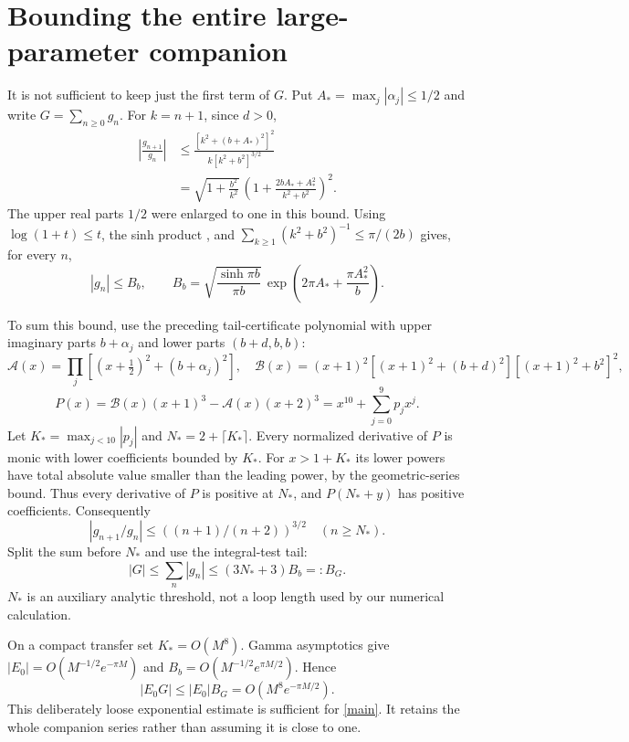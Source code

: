 \documentclass[11pt,a4paper]{article}
\begin{document}
\newpage
\section{Bounding the entire large-parameter companion}
It is not sufficient to keep just the first term of $G$.
Put $A_*=\max_j|\alpha_j|\le1/2$ and write $G=\sum_{n\ge0}g_n$.
For $k=n+1$, since $d>0$,
\begin{align}
 \left|\frac{g_{n+1}}{g_n}\right|
 &\le \frac{[k^2+(b+A_*)^2]^2}
 {k[k^2+b^2]^{3/2}}
 \nonumber\\
 &=\sqrt{1+\frac{b^2}{k^2}}\,
 \left(1+\frac{2bA_*+A_*^2}{k^2+b^2}\right)^2 .
 \label{ratio}
\end{align}
The upper real parts $1/2$ were enlarged to one in this bound.
Using $\log(1+t)\le t$, the sinh product \cite{product}, and
$\sum_{k\ge1}(k^2+b^2)^{-1}\le\pi/(2b)$ gives, for every $n$,
\begin{equation}
 |g_n|\le B_b,\qquad
 B_b=\sqrt{\frac{\sinh\pi b}{\pi b}}\,
       \exp\!\left(2\pi A_*+\frac{\pi A_*^2}{b}\right).
 \label{B}
\end{equation}

To sum this bound, use the preceding tail-certificate polynomial with
upper imaginary parts $b+\alpha_j$ and lower parts $(b+d,b,b)$:
\[
 \mathcal A(x)=\prod_j[(x+\tfrac12)^2+(b+\alpha_j)^2],
 \quad
 \mathcal B(x)=(x+1)^2[(x+1)^2+(b+d)^2][(x+1)^2+b^2]^2,
\]
\[
 P(x)=\mathcal B(x)(x+1)^3-\mathcal A(x)(x+2)^3
     =x^{10}+\sum_{j=0}^{9}p_jx^j.
\]
Let $K_*=\max_{j<10}|p_j|$ and
$N_*=2+\lceil K_*\rceil$.
Every normalized derivative of $P$ is monic with lower coefficients
bounded by $K_*$. For $x>1+K_*$ its lower powers have total absolute
value smaller than the leading power, by the geometric-series bound.
Thus every derivative of $P$ is positive at $N_*$, and
$P(N_*+y)$ has positive coefficients. Consequently
\[
 |g_{n+1}/g_n|\le((n+1)/(n+2))^{3/2}\quad(n\ge N_*).
\]
Split the sum before $N_*$ and use the integral-test tail:
\begin{equation}
 |G|\le\sum_n|g_n|\le (3N_*+3)B_b=:B_G .
 \label{G}
\end{equation}
$N_*$ is an auxiliary analytic threshold, not a loop length used by
our numerical calculation.

On a compact transfer set $K_*=O(M^8)$.
Gamma asymptotics give
$|E_0|=O(M^{-1/2}e^{-\pi M})$ and
$B_b=O(M^{-1/2}e^{\pi M/2})$.
Hence
\begin{equation}
 |E_0G|\le |E_0|B_G
     =O(M^8 e^{-\pi M/2}).
 \label{suppression}
\end{equation}
This deliberately loose exponential estimate is sufficient for
\eqref{main}. It retains the whole companion series rather than
assuming it is close to one.
\end{document}
